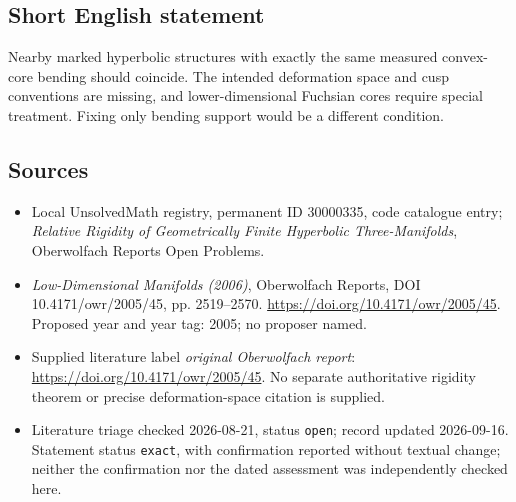 \documentclass[11pt]{article}
\begin{document}
\subsection{Short English statement}
Nearby marked hyperbolic structures with exactly the same measured convex-core bending should coincide. The intended deformation space and cusp conventions are missing, and lower-dimensional Fuchsian cores require special treatment. Fixing only bending support would be a different condition.
\subsection{Sources}
\begin{itemize}\item Local UnsolvedMath registry, permanent ID 30000335, code catalogue entry; \emph{Relative Rigidity of Geometrically Finite Hyperbolic Three-Manifolds}, Oberwolfach Reports Open Problems.\item \emph{Low-Dimensional Manifolds (2006)}, Oberwolfach Reports, DOI 10.4171/owr/2005/45, pp. 2519--2570. \url{https://doi.org/10.4171/owr/2005/45}. Proposed year and year tag: 2005; no proposer named.\item Supplied literature label \emph{original Oberwolfach report}: \url{https://doi.org/10.4171/owr/2005/45}. No separate authoritative rigidity theorem or precise deformation-space citation is supplied.\item Literature triage checked 2026-08-21, status \texttt{open}; record updated 2026-09-16. Statement status \texttt{exact}, with confirmation reported without textual change; neither the confirmation nor the dated assessment was independently checked here.\end{itemize}
\end{document}
